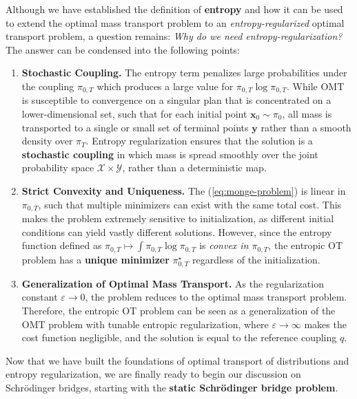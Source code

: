 \documentclass{article}
\newcommand{\purple}[2][]{%
  \begin{purplebox}[#1]
    #2
  \end{purplebox}
}
\begin{document}
\purple[Motivations for Entropy Regularization]{
Although we have established the definition of \textbf{entropy} and how it can be used to extend the optimal mass transport problem to an \textit{entropy-regularized} optimal transport problem, a question remains: \textit{Why do we need entropy-regularization?} The answer can be condensed into the following points:
\begin{enumerate}
    \item[(i)] \textbf{Stochastic Coupling.} The entropy term penalizes large probabilities under the coupling $\pi_{0,T}$ which produces a large value for $\pi_{0,T}\log \pi_{0,T}$. While OMT is susceptible to convergence on a singular plan that is concentrated on a lower-dimensional set, such that for each initial point $\boldsymbol{x}_0\sim \pi_0$, all mass is transported to a single or small set of terminal points $\boldsymbol{y}$ rather than a smooth density over $\pi_T$. Entropy regularization ensures that the solution is a \textbf{stochastic coupling} in which mass is spread smoothly over the joint probability space $\mathcal{X}\times\mathcal{Y}$, rather than a deterministic map.
    \item[(ii)] \textbf{Strict Convexity and Uniqueness.} The (\ref{eq:monge-problem}) is linear in $\pi_{0,T}$, such that multiple minimizers can exist with the same total cost. This makes the problem extremely sensitive to initialization, as different initial conditions can yield vastly different solutions. However, since the entropy function defined as $\pi_{0,T}\mapsto \int \pi_{0,T}\log \pi_{0,T}$ is \textit{convex in $\pi_{0,T}$}, the entropic OT problem has a \textbf{unique minimizer} $\pi^\star_{0,T}$ regardless of the initialization.
    \item[(iii)] \textbf{Generalization of Optimal Mass Transport.} As the regularization constant $\varepsilon\to 0$, the problem reduces to the optimal mass transport problem. Therefore, the entropic OT problem can be seen as a generalization of the OMT problem with tunable entropic regularization, where $\varepsilon\to \infty$ makes the cost function negligible, and the solution is equal to the reference coupling $q$.
\end{enumerate}
}

Now that we have built the foundations of optimal transport of distributions and entropy regularization, we are finally ready to begin our discussion on Schrödinger bridges, starting with the \textbf{static Schrödinger bridge problem}.
\end{document}
